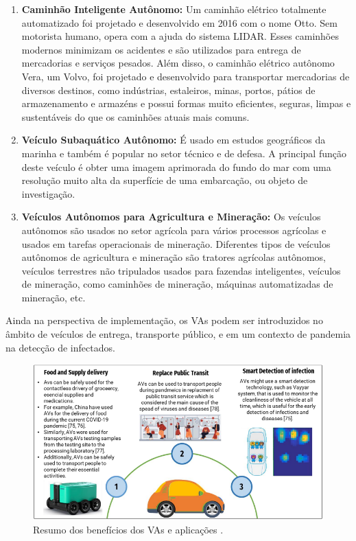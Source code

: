 \begin{enumerate}
\item \textbf{Caminhão Inteligente Autônomo:} Um caminhão elétrico totalmente automatizado foi projetado e desenvolvido em 2016 com o nome Otto. Sem motorista humano, opera com a ajuda do sistema LIDAR. Esses caminhões modernos minimizam os acidentes e são utilizados para entrega de mercadorias e serviços pesados. Além disso, o caminhão elétrico autônomo Vera, um Volvo, foi projetado e desenvolvido para transportar mercadorias de diversos destinos, como indústrias, estaleiros, minas, portos, pátios de armazenamento e armazéns e possui formas muito eficientes, seguras, limpas e sustentáveis do que os caminhões atuais mais comuns.

\item \textbf{Veículo Subaquático Autônomo:} É usado em estudos geográficos da marinha e também é popular no setor técnico e de defesa. A principal função deste veículo é obter uma imagem aprimorada do fundo do mar com uma resolução muito alta da superfície de uma embarcação, ou objeto de investigação.
\item \textbf{Veículos Autônomos para Agricultura e Mineração:}  Os veículos autônomos são usados no setor agrícola para vários processos agrícolas e usados em tarefas operacionais de mineração. Diferentes tipos de veículos autônomos de agricultura e mineração são tratores agrícolas autônomos, veículos terrestres não tripulados usados para fazendas inteligentes, veículos de mineração, como caminhões de mineração, máquinas automatizadas de mineração, etc.

\end{enumerate}

Ainda na perspectiva de implementação, os VAs podem ser introduzidos no âmbito de veículos de entrega, transporte público, e em um contexto de pandemia na detecção de infectados.

\begin{figure}[H]
\centering
\includegraphics[width=\textwidth]{Figures/aplic.png}
\caption{Resumo dos benefícios dos VAs e aplicações \cite{mundobrasil}.}
\label{resumo_aplic}
\end{figure}

